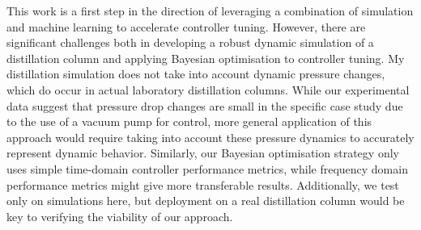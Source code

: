 This work is a first step in the direction of leveraging a combination of simulation and machine learning to accelerate controller tuning. However, there are significant challenges both in developing a robust dynamic simulation of a distillation column and applying Bayesian optimisation to controller tuning. My distillation simulation does not take into account dynamic pressure changes, which do occur in actual laboratory distillation columns. While our experimental data suggest that pressure drop changes are small in the specific case study due to the use of a vacuum pump for control, more general application of this approach would require taking into account these pressure dynamics to accurately represent dynamic behavior. Similarly, our Bayesian optimisation strategy only uses simple time-domain controller performance metrics, while frequency domain performance metrics might give more transferable results. Additionally, we test only on simulations here, but deployment on a real distillation column would be key to verifying the viability of our approach.

